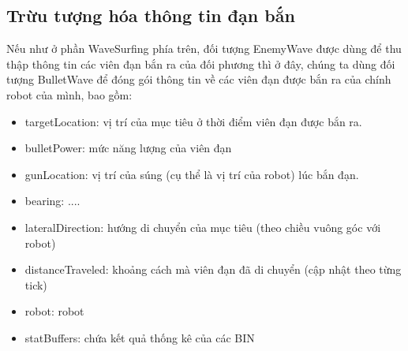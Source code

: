 \documentclass[14pt]{article}
\begin{document}
\subsection{Trừu tượng hóa thông tin đạn bắn}
Nếu như ở phần WaveSurfing phía trên, đối tượng EnemyWave được dùng để thu thập thông tin các viên đạn bắn ra của đối phương thì ở đây, chúng ta dùng đối tượng BulletWave để đóng gói thông tin về các viên đạn được bắn ra của chính robot của mình, bao gồm:
	\begin{itemize}
		\item targetLocation: vị trí của mục tiêu ở thời điểm viên đạn được bắn ra.
		\item bulletPower: mức năng lượng của viên đạn
		\item gunLocation: vị trí của súng (cụ thể là vị trí của robot) lúc bắn đạn.
		\item bearing: ....
		\item lateralDirection: hướng di chuyển của mục tiêu (theo chiều vuông góc với robot)
		\item distanceTraveled: khoảng cách mà viên đạn đã di chuyển (cập nhật theo từng tick)
		\item robot: robot
		\item statBuffers: chứa kết quả thống kê của các BIN
	\end{itemize}
\end{document}
